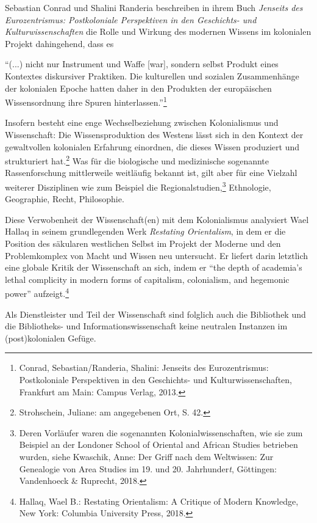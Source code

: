 \documentclass[a4paper,
fontsize=11pt,
oneside,
numbers=noperiodatend,
parskip=half-,
bibliography=totoc,
final
]{scrartcl}
\begin{document}
Sebastian Conrad und Shalini Randeria beschreiben in ihrem Buch
\emph{Jenseits des Eurozentrismus: Postkoloniale Perspektiven in den
Geschichts- und Kulturwissenschaften} die Rolle und Wirkung des modernen
Wissens im kolonialen Projekt dahingehend, dass es

\enquote{(...) nicht nur Instrument und Waffe {[}war{]}, sondern selbst
Produkt eines Kontextes diskursiver Praktiken. Die kulturellen und
sozialen Zusammenhänge der kolonialen Epoche hatten daher in den
Produkten der europäischen Wissensordnung ihre Spuren
hinterlassen.}\footnote{Conrad, Sebastian/Randeria, Shalini: Jenseits
  des Eurozentrismus: Postkoloniale Perspektiven in den Geschichts- und
  Kulturwissenschaften, Frankfurt am Main: Campus Verlag, 2013.}

Insofern besteht eine enge Wechselbeziehung zwischen Kolonialismus und
Wissenschaft: Die Wissensproduktion des Westens lässt sich in den
Kontext der gewaltvollen kolonialen Erfahrung einordnen, die dieses
Wissen produziert und strukturiert hat.\footnote{Strohschein, Juliane:
  am angegebenen Ort, S. 42.} Was für die biologische und medizinische
sogenannte Rassenforschung mittlerweile weitläufig bekannt ist, gilt
aber für eine Vielzahl weiterer Disziplinen wie zum Beispiel die
Regionalstudien,\footnote{Deren Vorläufer waren die sogenannten
  Kolonialwissenschaften, wie sie zum Beispiel an der Londoner School of
  Oriental and African Studies betrieben wurden, siehe Kwaschik, Anne:
  Der Griff nach dem Weltwissen: Zur Genealogie von Area Studies im 19.
  und 20. Jahrhunder\emph{t}, Göttingen: Vandenhoeck \& Ruprecht, 2018.}
Ethnologie, Geographie, Recht, Philosophie.

Diese Verwobenheit der Wissenschaft(en) mit dem Kolonialismus analysiert
Wael Hallaq in seinem grundlegenden Werk \emph{Restating Orientalism},
in dem er die Position des säkularen westlichen Selbst im Projekt der
Moderne und den Problemkomplex von Macht und Wissen neu untersucht. Er
liefert darin letztlich eine globale Kritik der Wissenschaft an sich,
indem er \enquote{the depth of academia's lethal complicity in modern
forms of capitalism, colonialism, and hegemonic power}
aufzeigt.\footnote{Hallaq, Wael B.: Restating Orientalism: A Critique of
  Modern Knowledge, New York: Columbia University Press, 2018.}

Als Dienstleister und Teil der Wissenschaft sind folglich auch die
Bibliothek und die Bibliotheks- und Informationswissenschaft keine
neutralen Instanzen im (post)kolonialen Gefüge.
\end{document}

